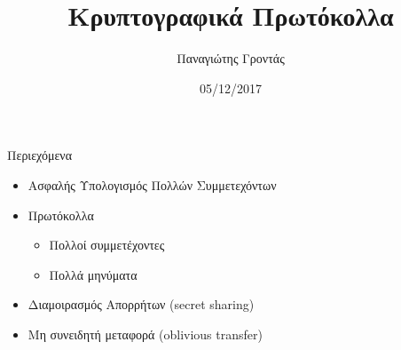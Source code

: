 \documentclass[handout]{beamer}
\title{Κρυπτογραφικά Πρωτόκολλα}
\author{Παναγιώτης Γροντάς}
\date{05/12/2017}
\institute{ΕΜΠ - Κρυπτογραφία - (2017-2018)}
\begin{document}
\newcommand{\xor}{ \oplus }
\newcommand{\msg}{ \mathtt{M} }
\newcommand{\KEY}{ \mathtt{K} }
\newcommand{\CPH}{ \mathtt{C} }
\newcommand{\keygen}{\mathtt{KeyGen}}
\newcommand{\enc}{\mathtt{Encrypt}}
\newcommand{\dec}{\mathtt{Decrypt}}
\newcommand{\sign}{\mathtt{Sign}}
\newcommand{\verify}{\mathtt{Verify}}
\newcommand{\adv}{$\mathcal{A}$ }
\newcommand{\Hash}{\mathcal{H} }
\newcommand{\advb}{$\mathcal{B}$ }
\newcommand{\chal}{$\mathcal{C}$ }
\newcommand{\cs}{$\mathcal{CS}$}
\newcommand{\Zed}{\mathbb{Z}} 
\newcommand{\zns}{\mathbb{Z}^*_n}
\newcommand{\zs}[1]{\mathbb{Z}^*_{#1}}

\newcommand{\green}[1]{\textcolor{teal}{#1}}
\newcommand{\Green}[1]{\textcolor{Teal}{#1}}
\newcommand{\ForestGreen}[1]{\textcolor{ForestGreen}{#1}}
\newcommand{\blue}[1]{\textcolor{blue}{#1}}
\newcommand{\magenta}[1]{\textcolor{magenta}{#1}}
\newcommand{\cyan}[1]{\textcolor{cyan}{#1}}

\newcommand{\twopartdef}[4]
{ 
		\begin{cases}
			#1 , #2 \\
			#3 , #4
		\end{cases} 
}

\begin{frame}
	\titlepage
\end{frame}
	
\begin{frame}{Περιεχόμενα}
\begin{itemize}
\item Ασφαλής Υπολογισμός Πολλών Συμμετεχόντων \pause 
\item Πρωτόκολλα
\begin{itemize}
	\item Πολλοί συμμετέχοντες
	\item Πολλά μηνύματα
\end{itemize}
\item Διαμοιρασμός Απορρήτων (secret sharing) \pause 
\item Μη συνειδητή μεταφορά (oblivious transfer) \pause
\end{itemize}
\end{frame}
\end{document}
